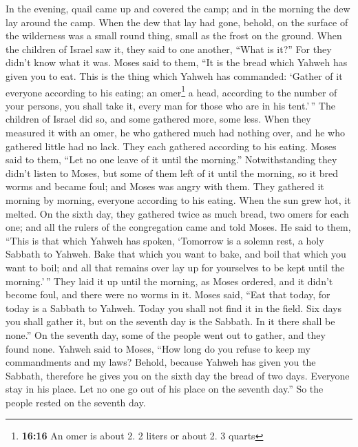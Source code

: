  In the evening, quail came up and covered the camp; and
in the morning the dew lay around the camp.  When the dew
that lay had gone, behold, on the surface of the wilderness was a small
round thing, small as the frost on the ground.  When the
children of Israel saw it, they said to one another, ``What is it?'' For
they didn't know what it was. Moses said to them, ``It is the bread
which Yahweh has given you to eat.  This is the thing
which Yahweh has commanded: `Gather of it everyone according to his
eating; an omer\footnote{\textbf{16:16} An omer is about 2. 2 liters or
  about 2. 3 quarts} a head, according to the number of your persons,
you shall take it, every man for those who are in his tent.'\,''
 The children of Israel did so, and some gathered more,
some less.  When they measured it with an omer, he who
gathered much had nothing over, and he who gathered little had no lack.
They each gathered according to his eating.  Moses said
to them, ``Let no one leave of it until the morning.'' 
Notwithstanding they didn't listen to Moses, but some of them left of it
until the morning, so it bred worms and became foul; and Moses was angry
with them.  They gathered it morning by morning, everyone
according to his eating. When the sun grew hot, it melted.
 On the sixth day, they gathered twice as much bread, two
omers for each one; and all the rulers of the congregation came and told
Moses.  He said to them, ``This is that which Yahweh has
spoken, `Tomorrow is a solemn rest, a holy Sabbath to Yahweh. Bake that
which you want to bake, and boil that which you want to boil; and all
that remains over lay up for yourselves to be kept until the
morning.'\,''  They laid it up until the morning, as
Moses ordered, and it didn't become foul, and there were no worms in it.
 Moses said, ``Eat that today, for today is a Sabbath to
Yahweh. Today you shall not find it in the field.  Six
days you shall gather it, but on the seventh day is the Sabbath. In it
there shall be none.''  On the seventh day, some of the
people went out to gather, and they found none.  Yahweh
said to Moses, ``How long do you refuse to keep my commandments and my
laws?  Behold, because Yahweh has given you the Sabbath,
therefore he gives you on the sixth day the bread of two days. Everyone
stay in his place. Let no one go out of his place on the seventh day.''
 So the people rested on the seventh day.

